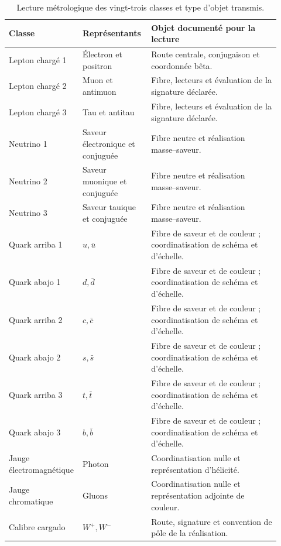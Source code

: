 \begingroup
\small
\setlength{\tabcolsep}{3pt}
\begin{table}[!htbp]
\centering\fontsize{9.2}{10.6}\selectfont\renewcommand{\arraystretch}{1.04}
\caption{Lecture métrologique des vingt-trois classes et type d’objet transmis.
}
\label{tab:vi-clases-metrologia}
\begin{tabular}{p{0.20\linewidth}p{0.25\linewidth}p{0.47\linewidth}}
\toprule
Classe
 & Représentants
 & Objet documenté pour la lecture
\\
\midrule

Lepton chargé 1
 & Électron et positron
 & Route centrale, conjugaison et coordonnée bêta.
\\
Lepton chargé 2
 & Muon et antimuon
 & Fibre, lecteurs et évaluation de la signature déclarée.
\\
Lepton chargé 3
 & Tau et antitau
 & Fibre, lecteurs et évaluation de la signature déclarée.
\\
Neutrino 1
 & Saveur électronique et conjuguée
 & Fibre neutre et réalisation masse--saveur.
\\
Neutrino 2
 & Saveur muonique et conjuguée
 & Fibre neutre et réalisation masse--saveur.
\\
Neutrino 3
 & Saveur tauique et conjuguée
 & Fibre neutre et réalisation masse--saveur.
\\
Quark arriba 1 & \(u,\bar u\) & Fibre de saveur et de couleur ; coordinatisation de schéma et d’échelle.
\\
Quark abajo 1 & \(d,\bar d\) & Fibre de saveur et de couleur ; coordinatisation de schéma et d’échelle.
\\
Quark arriba 2 & \(c,\bar c\) & Fibre de saveur et de couleur ; coordinatisation de schéma et d’échelle.
\\
Quark abajo 2 & \(s,\bar s\) & Fibre de saveur et de couleur ; coordinatisation de schéma et d’échelle.
\\
Quark arriba 3 & \(t,\bar t\) & Fibre de saveur et de couleur ; coordinatisation de schéma et d’échelle.
\\
Quark abajo 3 & \(b,\bar b\) & Fibre de saveur et de couleur ; coordinatisation de schéma et d’échelle.
\\
Jauge électromagnétique
 & Photon
 & Coordinatisation nulle et représentation d’hélicité.
\\
Jauge chromatique
 & Gluons
 & Coordinatisation nulle et représentation adjointe de couleur.
\\
Calibre cargado & \(W^+,W^-\) & Route, signature et convention de pôle de la réalisation.

\end{tabular}
\end{table}
